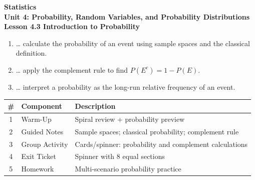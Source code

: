 \documentclass[10pt]{article}
\begin{document}
\vspace{-0.8in}

\begin{center}
  {\color{white}\textbf{\LARGE Statistics}}\\[4pt]
  {\color{skymid}\large\textbf{Unit 4: Probability, Random Variables, and Probability Distributions}}\\[6pt]
  {\color{white}\textbf{\large Lesson 4.3 \quad Introduction to Probability}}
\end{center}

\vspace{0.22in}
\namedateperiod
\vspace{0.18in}

\begin{learningtargetbox}
\small
\begin{enumerate}[leftmargin=1.5em, itemsep=5pt]
  \item \ldots{} calculate the probability of an event using sample spaces and the classical definition.
  \item \ldots{} apply the complement rule to find $P(E^c) = 1 - P(E)$.
  \item \ldots{} interpret a probability as the long-run relative frequency of an event.
\end{enumerate}
\end{learningtargetbox}

\vspace{0.14in}

\begin{tocbox}
\small
\renewcommand{\arraystretch}{1.5}
\begin{tabularx}{\linewidth}{@{} c l X @{}}
\rowcolor{sky}
\textbf{\#} & \textbf{Component} & \textbf{Description} \\
\midrule
1 & Warm-Up       & Spiral review + probability preview \\
2 & Guided Notes  & Sample spaces; classical probability; complement rule \\
3 & Group Activity & Cards/spinner: probability and complement calculations \\
4 & Exit Ticket   & Spinner with 8 equal sections \\
5 & Homework      & Multi-scenario probability practice \\
\end{tabularx}
\end{tocbox}
\end{document}
